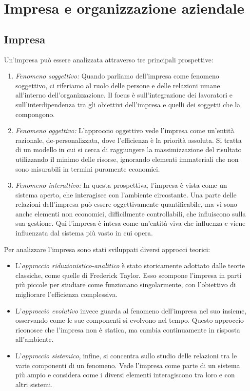 \part{Impresa e organizzazione aziendale}
\chapter{Impresa}
Un’impresa può essere analizzata attraverso tre principali prospettive:
\begin{enumerate}
    \item \textit{Fenomeno soggettivo:} Quando parliamo dell'impresa come fenomeno soggettivo, ci riferiamo al ruolo delle persone e delle relazioni umane all'interno dell’organizzazione. Il focus è sull'integrazione dei lavoratori e sull'interdipendenza tra gli obiettivi dell'impresa e quelli dei soggetti che la compongono.
    \item \textit{Fenomeno oggettivo:} L’approccio oggettivo vede l’impresa come un’entità razionale, de-personalizzata, dove l’efficienza è la priorità assoluta. Si tratta di un modello in cui si cerca di raggiungere la massimizzazione del risultato utilizzando il minimo delle risorse, ignorando elementi immateriali che non sono misurabili in termini puramente economici.
    \item \textit{Fenomeno interattivo:} In questa prospettiva, l'impresa è vista come un sistema aperto, che interagisce con l'ambiente circostante. Una parte delle relazioni dell'impresa può essere oggettivamente quantificabile, ma vi sono anche elementi non economici, difficilmente controllabili, che influiscono sulla sua gestione. Qui l’impresa è intesa come un'entità viva che influenza e viene influenzata dal sistema più vasto in cui opera.
\end{enumerate}

Per analizzare l’impresa sono stati sviluppati diversi approcci teorici:
\begin{itemize}
    \item L'\textit{approccio riduzionistico-analitico} è stato storicamente adottato dalle teorie classiche, come quelle di Frederick Taylor. Esso scompone l'impresa in parti più piccole per studiare come funzionano singolarmente, con l’obiettivo di migliorare l’efficienza complessiva.
    \item L'\textit{approccio evolutivo} invece guarda al fenomeno dell'impresa nel suo insieme, osservando come le sue componenti si evolvono nel tempo. Questo approccio riconosce che l'impresa non è statica, ma cambia continuamente in risposta all'ambiente.
    \item L'\textit{approccio sistemico}, infine, si concentra sullo studio delle relazioni tra le varie componenti di un fenomeno. Vede l’impresa come parte di un sistema più ampio e considera come i diversi elementi interagiscono tra loro e con altri sistemi.
\end{itemize}

